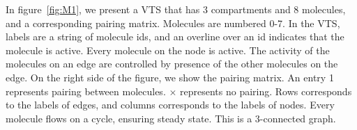 \begin{example}
%
In figure~\ref{fig:M1}, we present a VTS that has 3 compartments and 8 molecules, and a corresponding pairing matrix.
%
Molecules are numbered 0-7.
%
In the VTS, labels are a string of molecule ids, and an overline over an id indicates that the molecule is active.
%
Every molecule on the node is active.
%
The activity of the molecules on an edge are controlled
by presence of the other molecules on the edge.
%
On the right side of the figure, we show the pairing matrix.
%
An entry 1 represents pairing between molecules.
%
$\times$ represents no pairing.
%
Rows corresponds to the labels of edges, and
columns corresponds to the labels of nodes.
%
Every molecule flows on a cycle, ensuring steady state.
%
This is a 3-connected graph.
\end{example}


\label{subsec:graphmodel}
%

%

%
\



